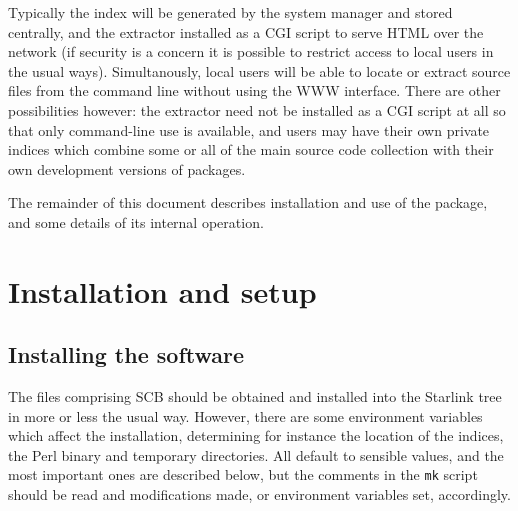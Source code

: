 \documentclass[twoside,11pt]{article}
\renewcommand{\_}{\texttt{\symbol{95}}}
\begin{document}
Typically the index
will be generated by the system manager and stored centrally,
and the extractor installed
as a CGI script to serve HTML over the network (if security is 
a concern it is possible to restrict access to local users in the
usual ways).  Simultanously, local users will be able to locate
or extract source files from the command line without using the 
WWW interface.  
There are other possibilities however: the extractor need not be
installed as a CGI script at all so that only command-line use
is available, and users may have their own private indices 
which combine some or all of the main source code collection 
with their own development versions of packages.

The remainder of this document describes installation and use of
the package, and some details of its internal operation.




\section{Installation and setup}

\subsection{Installing the software}

The files comprising SCB should be obtained and installed into
the Starlink tree in more or less the usual way.
However, there are some environment variables which affect the
installation, determining for instance the location of the 
indices, the Perl binary and temporary directories.  
All default to sensible values, and the most important ones
are described below, but the comments in the
{\tt mk} script should be read and modifications made,
or environment variables set, accordingly.
\end{document}
